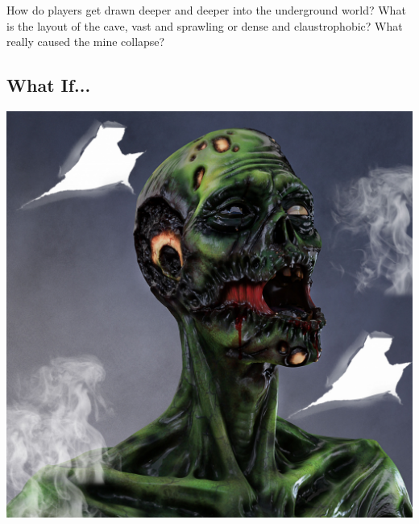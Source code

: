 \documentclass[a4,landscape]{book}
\begin{document}
\begin{multicols*}{4}
How do players get drawn deeper and deeper into the underground world?
What is the layout of the cave, vast and sprawling or dense and claustrophobic?
What really caused the mine collapse?

\subsection*{What If...}

\includegraphics[width=\columnwidth]{./zombie}


\end{multicols*}
\end{document}
